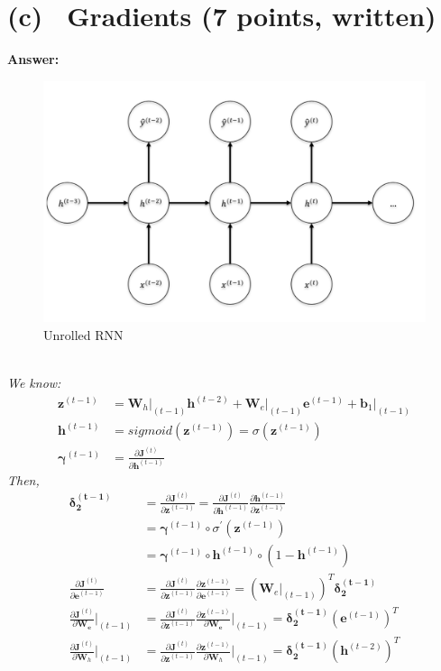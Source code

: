 \documentclass[fleqn]{MJD}
\newcommand{\subproblem}[2]{\section{(#1)~ #2}}
\newcommand{\0}{\emptyset}
\begin{document}
\newpage
\subproblem{c}{Gradients (7 points, written)}
\noindent \textbf{Answer:} \\
\begin{figure}[!htbp]
	\caption{Unrolled RNN}
	\label{figure:unrolled3timesteps}
	\centering
	\includegraphics[scale=0.75]{unrolled3timesteps}
\end{figure}
\textit {} \\
\textit {We know:} 
\begin{align}
\bm{z}^{(t-1)}&=\bm{W}_{h} \vert_{(t-1)} \bm{h}^{(t-2)} + \bm{W}_{e} \vert_{(t-1)} \bm{e}^{(t-1)} + \bm{b}_{1}\vert_{(t-1)}\\
\bm{h}^{(t-1)}&= sigmoid(\bm{z}^{(t-1)})=\sigma({\bm{z}}^{(t-1)}) \\
\bm{\gamma}^{(t-1)} &= \frac{\partial{\bm{J}^{(t)}}}{\partial{\bm{h}^{(t-1)}}} 
\end{align}
\textit {Then,} \\
\begin{align}
\bm{\delta_{2}^{(t-1)}} &= \frac{\partial{\bm{J}}^{(t)}}{\partial{\bm{z}}^{(t-1)}} = \frac{\partial{\bm{J}^{(t)}}}{\partial{\bm{h}^{(t-1)}}} %
	\frac{\partial{\bm{h}}^{(t-1)}}{\partial{\bm{z}}^{(t-1)}}  \nonumber \\
	&=\bm{\gamma}^{(t-1)}  \circ \sigma^{'}(\bm{z}^{(t-1)})  \nonumber \\
	&=\bm{\gamma}^{(t-1)}  \circ \bm{h}^{(t-1)} \circ (1 - \bm{h}^{(t-1)}) \\ 
\frac{\partial{\bm{J}^{(t)}}}{\partial{\bm{e}^{(t-1)}}} &= \frac{\partial{\bm{J}^{(t)}}}{\partial{\bm{z}^{(t-1)}}}  %
		\frac{\partial{\bm{z}^{(t-1)}}}{\partial{\bm{e}^{(t-1)}}} %
	 =  (\bm{W}_{e} \vert_{(t-1)})^{T} \bm{\delta_{2}^{(t-1)}}  \\
	 \frac{\partial{\bm{J}^{(t)}}}{\partial{\bm{W_{e}}}} \bigg\rvert_{(t-1)} &=\frac{\partial{\bm{J}^{(t)}}}{\partial{\bm{z}^{(t-1)}}}  %
	 		\frac{\partial{\bm{z}^{(t-1)}}}{\partial{\bm{W_{e}}}} \bigg\rvert_{(t-1)} %
	 = \bm{\delta_{2}^{(t-1)}} (\bm{e}^{(t-1)})^{T}  \\
	 \frac{\partial{\bm{J}^{(t)}}}{\partial{\bm{W}_{h}}}  \bigg\rvert_{(t-1)} &= \frac{\partial{\bm{J}^{(t)}}}{\partial{\bm{z}}^{(t-1)}} %
	 		 \frac{\partial{\bm{z}^{(t-1)}}}{\partial{\bm{W}_{h}}} \bigg\rvert_{(t-1)} %
	 =  \bm{\delta_{2}^{(t-1)}} (\bm{h}^{(t-2)})^{T}  
\end{align}
\end{document}
